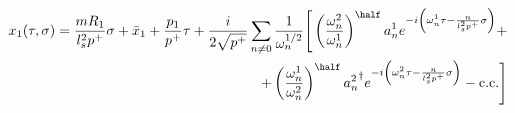 \begin{equation}
\begin{aligned}
x_1(\tau,\sigma) =
    \frac{m R_1}{l_s^2 p^+} \sigma + 
     \bar{x}_1 + \frac{p_1}{p^+} \tau + 
    \frac{i}{2 \sqrt{p^+}} \sum_{n \neq 0}  
        \frac{1}{\omega_n^{1/2}}  
                            \Bigg  [
              \left( \frac{\omega^2_n}{\omega^1_n}\right)^{\half} 
                a^1_n e^{-i \left(\omega^1_n \tau - \frac{n}{l_s^2 p^+} \sigma \right)} + \\
              +\left( \frac{\omega^1_n}{\omega^2_n}\right)^{\half}
                {a^2_n}^\dagger e^{-i \left(\omega^2_n \tau - \frac{n}{l_s^2 p^+} \sigma \right)} 
                      - \textrm{c.c.} 
                             \Bigg ]
\end{aligned}
\end{equation}

